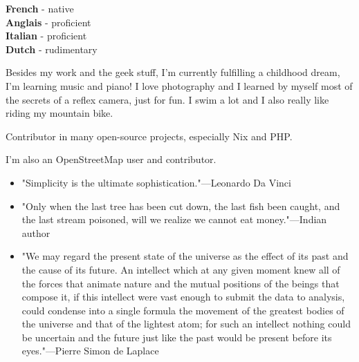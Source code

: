 \begin{minipage}[t]{.2\textwidth}
	\vspace{-\baselineskip} %


	\textbf{French} - native\\
	\textbf{Anglais} - proficient\\
	\textbf{Italian} - proficient\\
	\textbf{Dutch} - rudimentary\\
\end{minipage}
\hfill
\begin{minipage}[t]{.45\textwidth}
	\vspace{-\baselineskip} %


    Besides my work and the geek stuff, I’m currently fulfilling a childhood dream, I’m learning music and piano!
    I love photography and I learned by myself most of the secrets of a reflex camera, just for fun.
    I swim a lot and I also really like riding my mountain bike.
\end{minipage}
\hfill
\begin{minipage}[t]{.30\textwidth}
	\vspace{-\baselineskip} %


    Contributor in many open-source projects, especially Nix and PHP.

    I'm also an OpenStreetMap user and contributor.
\end{minipage}
\hfill
\begin{minipage}[t]{\textwidth}
	\vspace{-\baselineskip} %


    \begin{itemize}
        \item "Simplicity is the ultimate sophistication."{\tiny{---Leonardo Da Vinci}}
        \item "Only when the last tree has been cut down, the last fish been caught, and the last stream poisoned, will we realize we cannot eat money."{\tiny{---Indian author}}
        \item "We may regard the present state of the universe as the effect of its past and the cause of its future. An intellect which at any given moment knew all of the forces that animate nature and the mutual positions of the beings that compose it, if this intellect were vast enough to submit the data to analysis, could condense into a single formula the movement of the greatest bodies of the universe and that of the lightest atom; for such an intellect nothing could be uncertain and the future just like the past would be present before its eyes."{\tiny{---Pierre Simon de Laplace}}
    \end{itemize}
\end{minipage}

